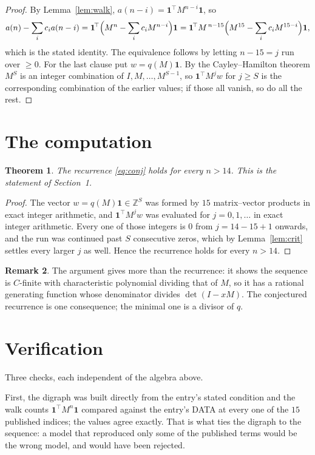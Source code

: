 \documentclass[11pt,a4paper]{article}
\theoremstyle{plain}
\newtheorem{theorem}{Theorem}
\theoremstyle{definition}
\newtheorem{remark}[theorem]{Remark}
\begin{document}
\begin{proof}
By Lemma~\ref{lem:walk}, $a(n-i)=\mathbf{1}^{\!\top}M^{n-i}\mathbf{1}$, so
\[
a(n)-\sum_i c_i a(n-i)
=\mathbf{1}^{\!\top}\Bigl(M^{n}-\sum_i c_i M^{n-i}\Bigr)\mathbf{1}
=\mathbf{1}^{\!\top}M^{\,n-15}\Bigl(M^{15}-\sum_i c_i M^{15-i}\Bigr)\mathbf{1},
\]
which is the stated identity. The equivalence follows by letting $n-15=j$ run over
$\ge0$. For the last clause put $w=q(M)\mathbf{1}$. By the Cayley--Hamilton theorem
$M^{S}$ is an integer combination of $I,M,\dots,M^{S-1}$, so
$\mathbf{1}^{\!\top}M^{j}w$ for $j\ge S$ is the corresponding combination of the
earlier values; if those all vanish, so do all the rest.
\end{proof}

\section{The computation}

\begin{theorem}
The recurrence \eqref{eq:conj} holds for every $n>14$. This is the statement of
Section~1.
\end{theorem}

\begin{proof}
The vector $w=q(M)\mathbf{1}\in\mathbb{Z}^{S}$ was formed by $15$ matrix--vector
products in exact integer arithmetic, and $\mathbf{1}^{\!\top}M^{j}w$ was evaluated for
$j=0,1,\dots$ in exact integer arithmetic. Every one of those integers is $0$ from
$j=14-15+1$ onwards, and the run was continued past $S$ consecutive zeros, which by
Lemma~\ref{lem:crit} settles every larger $j$ as well. Hence the recurrence holds for
every $n>14$.
\end{proof}

\begin{remark}
The argument gives more than the recurrence: it shows the sequence is $C$-finite with
characteristic polynomial dividing that of $M$, so it has a rational generating function
whose denominator divides $\det(I-xM)$. The conjectured recurrence is one consequence; the
minimal one is a divisor of $q$.
\end{remark}

\section{Verification}

Three checks, each independent of the algebra above.

First, the digraph was built directly from the entry's stated condition and the walk counts
$\mathbf{1}^{\!\top}M^{n}\mathbf{1}$ compared against the entry's DATA at every one of
the $15$ published indices; the values agree exactly. That is what ties the digraph to
the sequence: a model that reproduced only some of the published terms would be the wrong
model, and would have been rejected.
\end{document}
